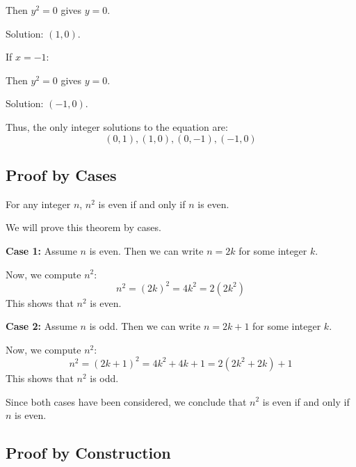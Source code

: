 	Then \( y^2 = 0 \) gives \( y = 0 \).
	\vspace{\baselineskip}

	Solution: \( (1, 0) \).
	\vspace{\baselineskip}

	If \( x = -1 \):
	\vspace{\baselineskip}

	Then \( y^2 = 0 \) gives \( y = 0 \).
	\vspace{\baselineskip}

	Solution: \( (-1, 0) \).
\vspace{\baselineskip}

	Thus, the only integer solutions to the equation are:
	\[
		(0, 1), (1, 0), (0, -1), (-1, 0)
	\]

\QED

\subsection{Proof by Cases}

For any integer \( n \), \( n^2 \) is even if and only if \( n \) is even.
\vspace{\baselineskip}

	We will prove this theorem by cases.
\vspace{\baselineskip}

	\textbf{Case 1:} Assume \( n \) is even. Then we can write \( n = 2k \) for some integer \( k \).
\vspace{\baselineskip}

	Now, we compute \( n^2 \):
	\[
		n^2 = {(2k)}^2 = 4k^2 = 2(2k^2)
	\]
	This shows that \( n^2 \) is even.
\vspace{\baselineskip}

	\textbf{Case 2:} Assume \( n \) is odd. Then we can write \( n = 2k + 1 \) for some integer \( k \).
\vspace{\baselineskip}

	Now, we compute \( n^2 \):
	\[
		n^2 = {(2k + 1)}^2 = 4k^2 + 4k + 1 = 2(2k^2 + 2k) + 1
	\]
	This shows that \( n^2 \) is odd.
\vspace{\baselineskip}

	Since both cases have been considered, we conclude that \( n^2 \) is even if and only if \( n \) is even.
\QED

\subsection{Proof by Construction}


